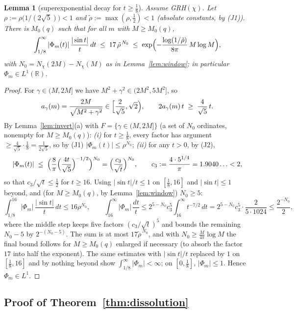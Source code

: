 \documentclass[11pt]{article}
\newtheorem{lemma}{Lemma}
\begin{document}
\begin{lemma}[superexponential decay for $t\ge\tfrac18$]\label{lem:bigt}
Assume GRH$(\chi)$. Let $\rho:=\rho\bigl(1/(2\sqrt5)\bigr)<1$ and
$\tilde\rho:=\max(\rho,\tfrac12)<1$ (absolute constants, by (J1)).
There is $M_0(q)$ such that for all $m$ with $M\ge M_0(q)$,
\[
\int_{1/8}^\infty|\Phi_m(t)|\,\frac{|\sin t|}{t}\,dt
\;\le\;17\,\tilde\rho^{\,N_0}
\;\le\;\exp\Bigl(-\frac{\log(1/\tilde\rho)}{8\pi}\,M\log M\Bigr),
\]
with $N_0=N_\chi(2M)-N_\chi(M)$ as in Lemma~\ref{lem:window};
in particular $\Phi_m\in L^1(\mathbb R)$.
\end{lemma}

\begin{proof}
For $\gamma\in(M,2M]$ we have $M^2+\gamma^2\in(2M^2,5M^2]$, so
\[
a_\gamma(m)=\frac{2M}{\sqrt{M^2+\gamma^2}}\in
\Bigl[\frac{2}{\sqrt5},\sqrt2\Bigr),
\qquad
2a_\gamma(m)\,t\;\ge\;\frac{4}{\sqrt5}\,t .
\]
By Lemma~\ref{lem:invert}(a) with $F=\{\gamma\in(M,2M]\}$ (a set of
$N_0$ ordinates, nonempty for $M\ge M_0(q)$):
\emph{(i)} for $t\ge\tfrac18$, every factor has argument
$\ge\tfrac{4}{\sqrt5}\cdot\tfrac18=\tfrac1{2\sqrt5}$, so by (J1)
$|\Phi_m(t)|\le\rho^{N_0}$;
\emph{(ii)} for any $t>0$, by (J2),
\[
|\Phi_m(t)|\;\le\;
\Bigl(\frac{8}{\pi}\Bigl(\frac{4t}{\sqrt5}\Bigr)^{-1/2}\Bigr)^{N_0}
=\Bigl(\frac{c_3}{\sqrt t}\Bigr)^{N_0},
\qquad
c_3:=\frac{4\cdot5^{1/4}}{\pi}=1.9040\ldots<2 ,
\]
so that $c_3/\sqrt t\le\tfrac12$ for $t\ge16$. Using
$|\sin t|/t\le1$ on $[\tfrac18,16]$ and $|\sin t|\le1$ beyond, and
(for $M\ge M_0(q)$, by Lemma~\ref{lem:window}) $N_0\ge5$:
\[
\int_{1/8}^{16}|\Phi_m|\,\frac{|\sin t|}t\,dt\le16\rho^{N_0},
\qquad
\int_{16}^\infty|\Phi_m|\,\frac{dt}t
\le2^{5-N_0}c_3^5\int_{16}^\infty t^{-7/2}\,dt
=2^{5-N_0}c_3^5\cdot\frac{2}{5\cdot1024}
\le\frac{2^{-N_0}}{2},
\]
where the middle step keeps five factors $(c_3/\sqrt t)^5$ and bounds
the remaining $N_0-5$ by $2^{-(N_0-5)}$. The sum is at most
$17\tilde\rho^{\,N_0}$, and with
$N_0\ge\tfrac{M}{4\pi}\log M$ the final bound follows for
$M\ge M_0(q)$ enlarged if necessary (to absorb the factor $17$ into
half the exponent). The same estimates with $|\sin t|/t$ replaced by
$1$ on $[\tfrac18,16]$ and by nothing beyond show
$\int_{1/8}^\infty|\Phi_m|<\infty$; on $[0,\tfrac18]$, $|\Phi_m|\le1$.
Hence $\Phi_m\in L^1$.
\end{proof}

\subsection*{Proof of Theorem~\ref{thm:dissolution}}
\end{document}
